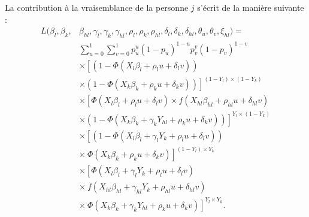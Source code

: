 \begin{Article}
\begin{refsection}[Bonnal]
La contribution à la vraisemblance de la personne $j$  s'écrit de la manière suivante :
\begin{align*}
    L(\beta_l,\beta_k,&\beta_{hl},\gamma_l,\gamma_k,\gamma_{hl},\rho_l,\rho_k,\rho_{hl},\delta_l,\delta_k,\delta_{hl},\theta_u,\theta_v,\xi_{hl})=\\
	&\sum_{u=0}^1\sum_{v=0}^1p_u^u(1-p_u)^{1-u} p_v^v(1-p_v)^{1-v} \\
	& \times\left[ \left(1 - \Phi(X_{l}\beta_{l} + \rho_{l}u + \delta_{l}v) \right) \right. \\
    & \left. \times \left(1 - \Phi(X_{k}\beta_{k} + \rho_{k}u + \delta_{k}v) \right)\right]^{(1-Y_{l})\times(1-Y_{k})}\\
	&\times \left[\Phi(X_{l}\beta_{l} + \rho_{l}u + \delta_{l}v) \times f(X_{hl}\beta_{hl} + \rho_{hl}u + \delta_{hl}v) \right. \\
	 &\times\left. \left(1 - \Phi(X_{k}\beta_{k} + \gamma_{k}Y_{hl} +\rho_{k}u + \delta_{k}v) \right)\right]^{Y_{l}\times(1-Y_{k})}\\
	&\times \left[\left(1 - \Phi(X_{l}\beta_{l} + \gamma_{l}Y_{k} + \rho_{l}u + \delta_{l}v) \right)\right.\\
    & \left. \times \ \Phi(X_{k}\beta_{k} + \rho_{k}u + \delta_{k}v) \right]^{(1-Y_{l})\times Y_{k}}\\
	&\times \left[\Phi(X_{l}\beta_{l} + \gamma_{l}Y_{k} + \rho_{l}u + \delta_{l}v) \right.\\
    &\left. \times \ f(X_{hl}\beta_{hl} + \gamma_{hl}Y_{k} + \rho_{hl}u + \delta_{hl}v) \right.  \\
	&\left. \times\ \Phi(X_{k}\beta_{k} + \gamma_{k}Y_{hl} + \rho_{k}u + \delta_{k}v) \right]^{Y_{l} \times Y_{k}}.
\end{align*}


\end{refsection}
\end{Article}
